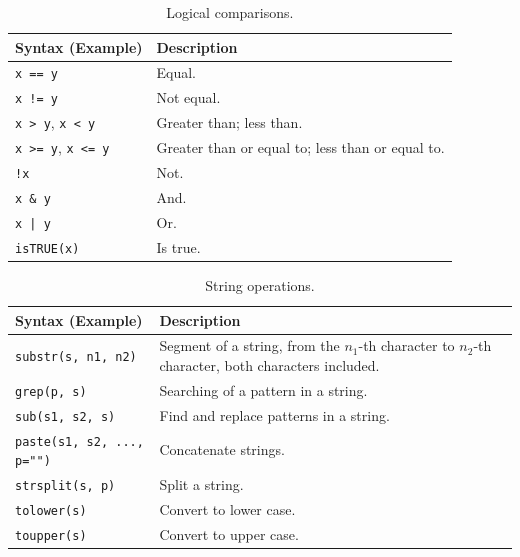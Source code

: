 \begin{table}
  \centering \caption{Logical comparisons.}\label{ch:r1:tab:logicalcomparison}
  \begin{tabularx}{\textwidth}{lX}
    \hline
    Syntax (Example) & Description \\ \hline
    \verb|x == y| & Equal. \\
    \verb|x != y| & Not equal. \\
    \verb|x > y|, \verb|x < y| & Greater than; less than. \\
    \verb|x >= y|, \verb|x <= y| & Greater than or equal to; less than or equal to. \\
    \verb|!x| & Not. \\
    \verb|x & y| & And. \\
    \verb$x | y$ & Or. \\
    \verb|isTRUE(x)| & Is true. \\
    \hline
  \end{tabularx}
\end{table}

\begin{table}
  \centering \caption{String operations.}\label{ch:r1:tab:stringoperation}
  \begin{tabularx}{\textwidth}{lX}
    \hline
    Syntax (Example) & Description \\ \hline
    \verb|substr(s, n1, n2)| & Segment of a string, from the $n_1$-th character to $n_2$-th character, both characters included. \\
    \verb|grep(p, s)| & Searching of a pattern in a string. \\
    \verb|sub(s1, s2, s)| & Find and replace patterns in a string. \\
    \verb|paste(s1, s2, ..., p="")| & Concatenate strings. \\
    \verb|strsplit(s, p)| & Split a string. \\
    \verb|tolower(s)| & Convert to lower case. \\
    \verb|toupper(s)| & Convert to upper case. \\
    \hline
  \end{tabularx}
\end{table}

